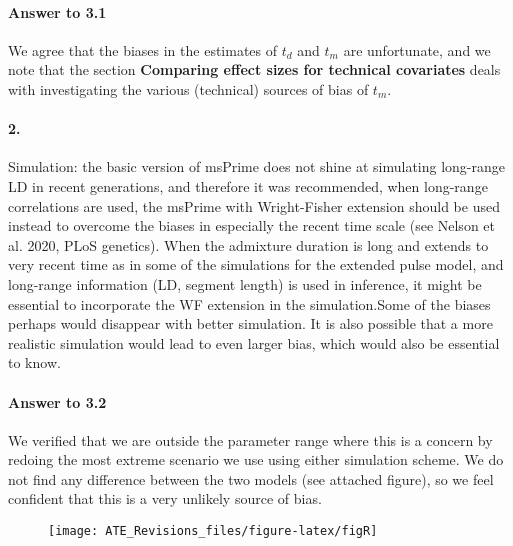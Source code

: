 \documentclass[11pt]{article}
\let\oldparagraph\paragraph
\renewcommand{\paragraph}[1]{\oldparagraph{#1}\mbox{}}
\begin{document}
\paragraph{Answer to 3.1}
We agree that the biases in the estimates of $t_d$ and $t_m$ are unfortunate, and we note that the section \textbf{Comparing effect sizes for technical covariates} deals with investigating the various (technical) sources of bias of $t_m$. 

\paragraph{2.}
Simulation: the basic version of msPrime does not shine at simulating long-range LD in recent generations, and therefore it was recommended, when long-range correlations are used, the msPrime with Wright-Fisher extension should be used instead to overcome the biases in especially the recent time scale (see Nelson et al. 2020, PLoS genetics). When the admixture duration is long and extends to very recent time as in some of the simulations for the extended pulse model, and long-range information (LD, segment length) is used in inference, it might be essential to incorporate the WF extension in the simulation.Some of the biases perhaps would disappear with better simulation. It is also possible that a more realistic simulation would lead to even larger bias, which would also be essential to know.

\paragraph{Answer to 3.2}
We verified that we are outside the parameter range where this is a concern by redoing the most extreme scenario we use using either simulation scheme. We do not find any difference between the two models (see attached figure), so we feel confident that this is a very unlikely source of bias.

\begin{figure}
\centering
\texttt{[image: ATE\_Revisions\_files/figure-latex/figR]}
\caption{\label{fig:fig_R} }
\end{figure}
\end{document}

